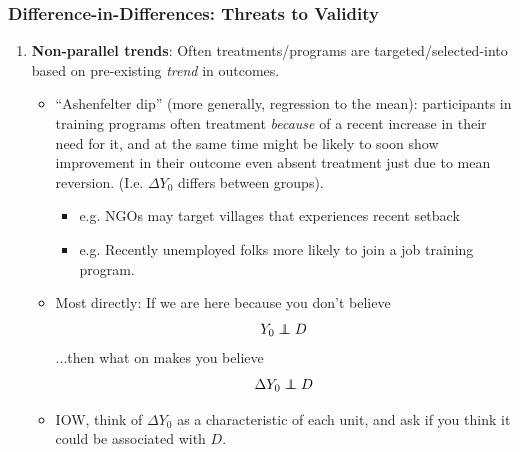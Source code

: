 \documentclass[xcolor=dvipsnames]{beamer}
\newcommand\indep{\protect\mathpalette{\protect\independenT}{\perp}}
\def\independenT#1#2{\mathrel{\rlap{$#1#2$}\mkern2mu{#1#2}}}
\begin{document}
\begin{frame}
  \frametitle{Difference-in-Differences: Threats to Validity}

\begin{enumerate}
 \item<1-> \textbf{Non-parallel trends}: Often treatments/programs are targeted/selected-into based on pre-existing \textit{trend} in outcomes.\medskip

 \begin{itemize}
  \footnotesize
   \item<2-> ``Ashenfelter dip'' (more generally, regression to the mean): participants in training programs often treatment \textit{because} of a recent increase in their need for it, and at the same time might be likely to soon show improvement in their outcome even absent treatment just due to mean reversion. (I.e. $\Delta Y_0$ differs between groups).\medskip
  \begin{itemize}
   \item<4-> e.g. NGOs may target villages that experiences recent setback 
   \item<5-> e.g. Recently unemployed folks more likely to join a job training program.
   \end{itemize}
   \medskip
   \item<5-> Most directly: If we are here because you don't believe
   \[ Y_0 \indep D \]
...then what on makes you believe  
 \[ \Delta Y_0 \indep D \]
   \item<6-> IOW, think of $\Delta Y_0$ as a characteristic of each unit, and ask if you think it could be associated with $D$. 
 \end{itemize}

\end{enumerate}
\end{frame}
\end{document}

